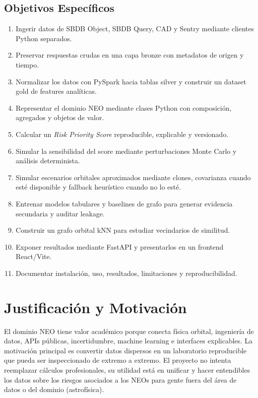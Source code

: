 \documentclass[12pt,a4paper]{report}
\begin{document}
\section{Objetivos Específicos}

\begin{enumerate}
  \item Ingerir datos de SBDB Object, SBDB Query, CAD y Sentry mediante clientes Python separados.
  \item Preservar respuestas crudas en una capa bronze con metadatos de origen y tiempo.
  \item Normalizar los datos con PySpark hacia tablas silver y construir un dataset gold de features analíticas.
  \item Representar el dominio NEO mediante clases Python con composición, agregados y objetos de valor.
  \item Calcular un \emph{Risk Priority Score} reproducible, explicable y versionado.
  \item Simular la sensibilidad del score mediante perturbaciones Monte Carlo y análisis determinista.
  \item Simular escenarios orbitales aproximados mediante clones, covarianza cuando esté disponible y fallback heurístico cuando no lo esté.
  \item Entrenar modelos tabulares y baselines de grafo para generar evidencia secundaria y auditar leakage.
  \item Construir un grafo orbital kNN para estudiar vecindarios de similitud.
  \item Exponer resultados mediante FastAPI y presentarlos en un frontend React/Vite.
  \item Documentar instalación, uso, resultados, limitaciones y reproducibilidad.
\end{enumerate}

\chapter{Justificación y Motivación}

El dominio NEO tiene valor académico porque conecta física orbital, ingeniería de datos, APIs públicas, incertidumbre, machine learning e interfaces explicables. La motivación principal es convertir datos dispersos en un laboratorio reproducible que pueda ser inspeccionado de extremo a extremo. El proyecto no intenta reemplazar cálculos profesionales, su utilidad está en unificar y hacer entendibles los datos sobre los riesgos asociados a los NEOs para gente fuera del área de datos o del dominio (astrofísica).
\end{document}
